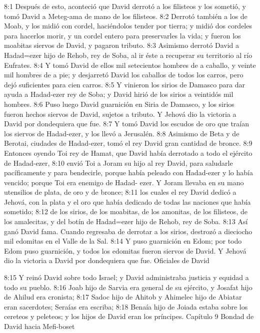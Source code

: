 8:1 Después de esto, aconteció que David derrotó a los filisteos y los sometió, y tomó David a Meteg-ama de mano de los filisteos.  
8:2 Derrotó también a los de Moab, y los midió con cordel, haciéndolos tender por tierra; y midió dos cordeles para hacerlos morir, y un cordel entero para preservarles la vida; y fueron los moabitas siervos de David, y pagaron tributo.  
8:3 Asimismo derrotó David a Hadad=ezer hijo de Rehob, rey de Soba, al ir éste a recuperar su territorio al río Eufrates.  
8:4 Y tomó David de ellos mil setecientos hombres de a caballo, y veinte mil hombres de a pie; y desjarretó David los caballos de todos los carros, pero dejó suficientes para cien carros.  
8:5 Y vinieron los sirios de Damasco para dar ayuda a Hadad-ezer rey de Soba; y David hirió de los sirios a veintidós mil hombres.  
8:6 Puso luego David guarnición en Siria de Damasco, y los sirios fueron hechos siervos de David, sujetos a tributo. Y Jehová dio la victoria a David por dondequiera que fue.  
8:7 Y tomó David los escudos de oro que traían los siervos de Hadad-ezer, y los llevó a Jerusalén.  
8:8 Asimismo de Beta y de Berotai, ciudades de Hadad-ezer, tomó el rey David gran cantidad de bronce.  
8:9 Entonces oyendo Toi rey de Hamat, que David había derrotado a todo el ejército de Hadad-ezer,  
8:10 envió Toi a Joram su hijo al rey David, para saludarle pacíficamente y para bendecirle, porque había peleado con Hadad-ezer y lo había vencido; porque Toi era enemigo de Hadad- ezer. Y Joram llevaba en su mano utensilios de plata, de oro y de bronce;  
8:11 los cuales el rey David dedicó a Jehová, con la plata y el oro que había dedicado de todas las naciones que había sometido;  
8:12 de los sirios, de los moabitas, de los amonitas, de los filisteos, de los amalecitas, y del botín de Hadad=ezer hijo de Rehob, rey de Soba.  
8:13 Así ganó David fama. Cuando regresaba de derrotar a los sirios, destrozó a dieciocho mil edomitas en el Valle de la Sal. 
8:14 Y puso guarnición en Edom; por todo Edom puso guarnición, y todos los edomitas fueron siervos de David. Y Jehová dio la victoria a David por dondequiera que fue.  
Oficiales de David  
 
8:15 Y reinó David sobre todo Israel; y David administraba justicia y equidad a todo su pueblo.  
8:16 Joab hijo de Sarvia era general de su ejército, y Josafat hijo de Ahilud era cronista;  
8:17 Sadoc hijo de Ahitob y Ahimelec hijo de Abiatar eran sacerdotes; Seraías era escriba;  
8:18 Benaía hijo de Joiada estaba sobre los cereteos y peleteos; y los hijos de David eran los príncipes.  
Capítulo 9 
Bondad de David hacia Mefi-boset  

